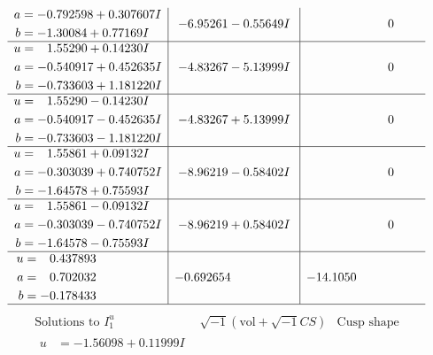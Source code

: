\documentclass[1p]{elsarticle_modified}
\theoremstyle{definition}
\newcommand{\I}{\sqrt{-1}}
\begin{document}
$$\begin{array}{c|c|c}
\begin{aligned}
a &= -0.792598 + 0.307607 I \\
b &= -1.30084 + 0.77169 I\end{aligned}
 & -6.95261 - 0.55649 I & \phantom{-0.000000 } 0 \\ \hline\begin{aligned}
u &= \phantom{-}1.55290 + 0.14230 I \\
a &= -0.540917 + 0.452635 I \\
b &= -0.733603 + 1.181220 I\end{aligned}
 & -4.83267 - 5.13999 I & \phantom{-0.000000 } 0 \\ \hline\begin{aligned}
u &= \phantom{-}1.55290 - 0.14230 I \\
a &= -0.540917 - 0.452635 I \\
b &= -0.733603 - 1.181220 I\end{aligned}
 & -4.83267 + 5.13999 I & \phantom{-0.000000 } 0 \\ \hline\begin{aligned}
u &= \phantom{-}1.55861 + 0.09132 I \\
a &= -0.303039 + 0.740752 I \\
b &= -1.64578 + 0.75593 I\end{aligned}
 & -8.96219 - 0.58402 I & \phantom{-0.000000 } 0 \\ \hline\begin{aligned}
u &= \phantom{-}1.55861 - 0.09132 I \\
a &= -0.303039 - 0.740752 I \\
b &= -1.64578 - 0.75593 I\end{aligned}
 & -8.96219 + 0.58402 I & \phantom{-0.000000 } 0 \\ \hline\begin{aligned}
u &= \phantom{-}0.437893\phantom{ +0.000000I} \\
a &= \phantom{-}0.702032\phantom{ +0.000000I} \\
b &= -0.178433\phantom{ +0.000000I}\end{aligned}
 & -0.692654\phantom{ +0.000000I} & -14.1050\phantom{ +0.000000I}\\
 \hline 
 \end{array}$$\newpage$$\begin{array}{c|c|c}  
\text{Solutions to }I^u_{1}& \I (\text{vol} + \sqrt{-1}CS) & \text{Cusp shape}\\
 \hline 
\begin{aligned}
u &= -1.56098 + 0.11999 I \\

\end{aligned}
\end{array}$$
\end{document}
